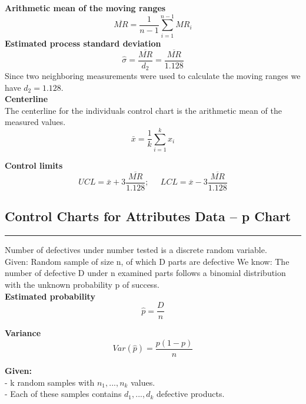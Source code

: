 \textbf{Arithmetic mean of the moving ranges}
\begin{equation}
  \overline{MR} = \frac{1}{n-1} \sum_{i=1}^{n-1}MR_i
\end{equation}
\textbf{Estimated process standard deviation}
\begin{equation}
  \hat{\sigma} = \frac{\overline{MR}}{d_2} = \frac{\overline{MR}}{1.128}
\end{equation}
Since two neighboring measurements were used to calculate the moving ranges we have $d_2 = 1.128$.\\

\textbf{Centerline}\\
The centerline for the individuals control chart is the arithmetic mean of the measured values.
\begin{equation}
  \bar{x} = \frac{1}{k} \sum^k_{i=1} x_i
\end{equation}

\textbf{Control limits}
\begin{equation}
    UCL = \bar{x} + 3 \frac{\overline{MR}}{1.128}; \;\;\;\;\;  LCL = \overline{x} - 3 \frac{\overline{MR}}{1.128}
\end{equation}

\subsection{Control Charts for Attributes Data – p Chart}
\noindent\rule[\linienAbstand]{\linewidth}{\linienDicke}
Number of defectives under number tested is a discrete random variable.\\

Given: Random sample of size n, of which D parts are defective
We know: The number of defective D under n examined parts follows a binomial distribution with the unknown probability p of success.\\

\textbf{Estimated probability}
\begin{equation}
  \hat{p} = \frac{D}{n}
\end{equation}

\textbf{Variance}
\begin{equation}
  Var(\hat{p}) = \frac{p(1-p)}{n}
\end{equation}

\textbf{Given:}\\
 - k random samples with $n_1,...,n_k$ values.\\
 - Each of these samples contains $d_1,...,d_k$ defective products.\\

